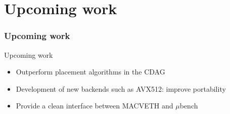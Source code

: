 \documentclass[xcolor=table,hideothersubsections,aspectratio=1610]{beamer}
\begin{document}


\section{Upcoming work}
\frametitle{Upcoming work}
\begin{frame}{Upcoming work}
    \begin{itemize}
        \item Outperform placement algorithms in the CDAG
        \item Development of new backends such as AVX512: improve portability
        \item Provide a clean interface between MACVETH and $\mu$bench
    \end{itemize}
\end{frame}

\begin{frame}[plain,t]
    \titlepage
\end{frame}
\end{document}
